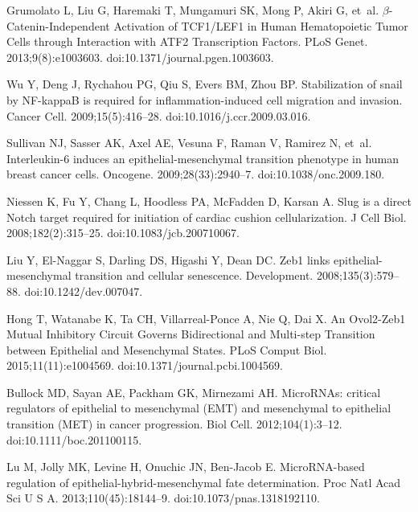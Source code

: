 \documentclass[11pt,letterpaper]{article}
\begin{document}
\begin{thebibliography}{10}
Grumolato L, Liu G, Haremaki T, Mungamuri SK, Mong P, Akiri G, et~al.
\newblock $\beta$-Catenin-Independent Activation of TCF1/LEF1 in Human Hematopoietic
  Tumor Cells through Interaction with ATF2 Transcription Factors.
\newblock PLoS Genet. 2013;9(8):e1003603.
\newblock doi:{10.1371/journal.pgen.1003603}.

Wu Y, Deng J, Rychahou PG, Qiu S, Evers BM, Zhou BP.
\newblock Stabilization of snail by NF-kappaB is required for
  inflammation-induced cell migration and invasion.
\newblock Cancer Cell. 2009;15(5):416--28.
\newblock doi:{10.1016/j.ccr.2009.03.016}.

Sullivan NJ, Sasser AK, Axel AE, Vesuna F, Raman V, Ramirez N, et~al.
\newblock Interleukin-6 induces an epithelial-mesenchymal transition phenotype
  in human breast cancer cells.
\newblock Oncogene. 2009;28(33):2940--7.
\newblock doi:{10.1038/onc.2009.180}.

Niessen K, Fu Y, Chang L, Hoodless PA, McFadden D, Karsan A.
\newblock Slug is a direct Notch target required for initiation of cardiac
  cushion cellularization.
\newblock J Cell Biol. 2008;182(2):315--25.
\newblock doi:{10.1083/jcb.200710067}.

Liu Y, El-Naggar S, Darling DS, Higashi Y, Dean DC.
\newblock Zeb1 links epithelial-mesenchymal transition and cellular senescence.
\newblock Development. 2008;135(3):579--88.
\newblock doi:{10.1242/dev.007047}.

Hong T, Watanabe K, Ta CH, Villarreal-Ponce A, Nie Q, Dai X.
\newblock An Ovol2-Zeb1 Mutual Inhibitory Circuit Governs Bidirectional and
  Multi-step Transition between Epithelial and Mesenchymal States.
\newblock PLoS Comput Biol. 2015;11(11):e1004569.
\newblock doi:{10.1371/journal.pcbi.1004569}.

Bullock MD, Sayan AE, Packham GK, Mirnezami AH.
\newblock MicroRNAs: critical regulators of epithelial to mesenchymal (EMT) and
  mesenchymal to epithelial transition (MET) in cancer progression.
\newblock Biol Cell. 2012;104(1):3--12.
\newblock doi:{10.1111/boc.201100115}.

Lu M, Jolly MK, Levine H, Onuchic JN, Ben-Jacob E.
\newblock MicroRNA-based regulation of epithelial-hybrid-mesenchymal fate
  determination.
\newblock Proc Natl Acad Sci U S A. 2013;110(45):18144--9.
\newblock doi:{10.1073/pnas.1318192110}.


\end{thebibliography}
\end{document}
